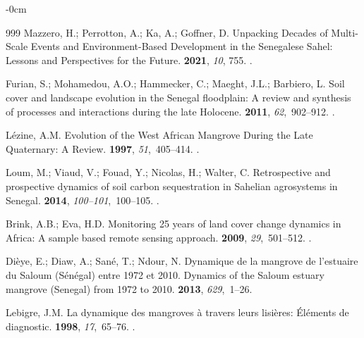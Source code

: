\documentclass[earth,article,accept,pdftex,moreauthors]{Definitions/mdpi}
\begin{document}
{\begin{adjustwidth}{-\extralength}{0cm}
\begin{thebibliography}{999}
Mazzero, H.; Perrotton, A.; Ka, A.; Goffner, D.
\newblock Unpacking Decades of Multi-Scale Events and Environment-Based
  Development in the Senegalese Sahel: Lessons and Perspectives for the Future.
 {\bf 2021}, {\em 10}, 755.
.

Furian, S.; Mohamedou, A.O.; Hammecker, C.; Maeght, J.L.; Barbiero, L.
\newblock Soil cover and landscape evolution in the Senegal floodplain: A
  review and synthesis of processes and interactions during the late Holocene.
 {\bf 2011}, {\em
  62},~902--912.
.

Lézine, A.M.
\newblock Evolution of the West African Mangrove During the Late Quaternary: A
  Review.
 {\bf 1997}, {\em
  51},~405--414.
.

Loum, M.; Viaud, V.; Fouad, Y.; Nicolas, H.; Walter, C.
\newblock Retrospective and prospective dynamics of soil carbon sequestration
  in Sahelian agrosystems in Senegal.
 {\bf 2014}, {\em
  100--101},~100--105.
.

Brink, A.B.; Eva, H.D.
\newblock Monitoring 25 years of land cover change dynamics in Africa: A sample
  based remote sensing approach.
 {\bf 2009}, {\em 29},~501--512.
.

Di{\`e}ye, E.; Diaw, A.; San{\'e}, T.; Ndour, N.
\newblock Dynamique de la mangrove de l’estuaire du Saloum (S{\'e}n{\'e}gal)
  entre 1972 et 2010. Dynamics of the Saloum estuary mangrove (Senegal) from
  1972 to 2010.
 {\bf 2013}, {\em 629},~1--26. %

Lebigre, J.M.
\newblock La dynamique des mangroves à travers leurs lisières: Éléments de
  diagnostic.
 {\bf
  1998}, {\em 17},~65--76.
.


\end{thebibliography}
\end{adjustwidth}}
\end{document}
